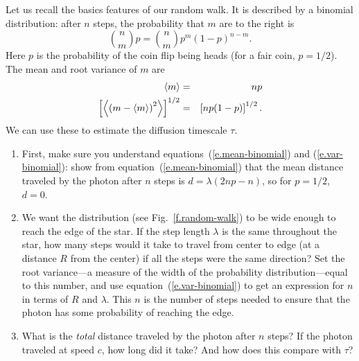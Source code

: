 Let us recall the basics features of our random walk. It is described by a binomial distribution: after $n$ steps, the probability that $m$ are to the right is
\begin{equation}\label{e.binomial}
    \binom{n}{m}{p} = {n\choose m} p^{m}(1-p)^{n-m}.
\end{equation}
Here $p$ is the probability of the coin flip being heads (for a fair coin, $p=1/2$).  The mean and root variance of $m$ are
\begin{eqnarray}
	\left\langle m\right\rangle &=& np \label{e.mean-binomial} \\
	\left[\left\langle\left(m-\left\langle m\right\rangle\right)^{2}\right\rangle\right]^{1/2} &=& \left[np(1-p)\right]^{1/2}. \label{e.var-binomial}
\end{eqnarray}
We can use these to estimate the diffusion timescale $\tau$.

\begin{exercisebox}
\begin{enumerate}
\item
First, make sure you understand equations~(\ref{e.mean-binomial}) and (\ref{e.var-binomial}): show from equation~(\ref{e.mean-binomial}) that the mean distance traveled by the photon after $n$ steps is $d = \lambda(2np-n)$, so for $p=1/2$, $d = 0$.

\item
We want the distribution (see Fig.~\ref{f.random-walk}) to be wide enough to reach the edge of the star.  If the step length $\lambda$ is the same throughout the star, how many steps would it take to travel from center to edge (at a distance $R$ from the center) if all the steps were the same direction?  Set the root variance---a measure of the width of the probability distribution---equal to this number, and use equation~(\ref{e.var-binomial}) to get an expression for $n$ in terms of $R$ and $\lambda$. This $n$ is the number of steps needed to ensure that the photon has some probability of reaching the edge.

\item
What is the \emph{total} distance traveled by the photon after $n$ steps? If the photon traveled at speed $c$, how long did it take?  And how does this compare with $\tau$?

\end{enumerate}
\end{exercisebox}
